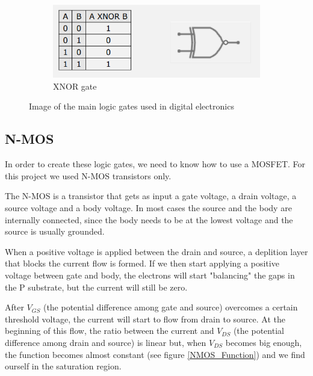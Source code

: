 \documentclass{article}
\begin{document}
\begin{figure}[h!]
    \centering
    \begin{subfigure}{.4\textwidth}
        \centering
        \includegraphics[width=\linewidth]{IM_XNOR.PNG}
        \caption{XNOR gate}
        \label{XNOR}
    \end{subfigure}

\caption{Image of the main logic gates used in digital electronics}
\label{LogicGates}
\end{figure}

\subsection{N-MOS}

In order to create these logic gates, we need to know how to use a MOSFET. For this project we used N-MOS transistors only.

\vspace{3mm}

The N-MOS is a transistor that gets as input a gate voltage, a drain voltage, a source voltage and a body voltage. In most cases the source and the body are internally connected, since the body needs to be at the lowest voltage and the source is usually grounded.

\vspace{3mm}

When a positive voltage is applied between the drain and source, a deplition layer that blocks the current flow is formed. 
If we then start applying a positive voltage between gate and body, the electrons will start "balancing" the gaps in the P substrate, but the current will still be zero.

\vspace{3mm}

After $V_{GS}$ (the potential difference among gate and source) overcomes a certain threshold voltage, the current will start to flow from drain to source. At the beginning of this flow, the ratio between the current and $V_{DS}$ (the potential difference among drain and source) is linear but, when $V_{DS}$ becomes big enough, the function becomes almost constant (see figure \ref{NMOS_Function}) and we find ourself in the saturation region.
\end{document}

